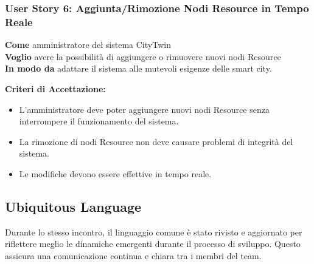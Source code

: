 \subsubsection{User Story 6: Aggiunta/Rimozione Nodi Resource in Tempo Reale}

\textbf{Come} amministratore del sistema CityTwin \\
\textbf{Voglio} avere la possibilità di aggiungere o rimuovere nuovi nodi Resource \\
\textbf{In modo da} adattare il sistema alle mutevoli esigenze delle smart city.

\textbf{Criteri di Accettazione:}
\begin{itemize}
    \item L'amministratore deve poter aggiungere nuovi nodi Resource senza interrompere il funzionamento del sistema.
    \item La rimozione di nodi Resource non deve causare problemi di integrità del sistema.
    \item Le modifiche devono essere effettive in tempo reale.
\end{itemize}

\subsection{Ubiquitous Language}

Durante lo stesso incontro, il linguaggio comune è stato rivisto e aggiornato per riflettere meglio le dinamiche emergenti durante il processo di sviluppo. Questo assicura una comunicazione continua e chiara tra i membri del team.


